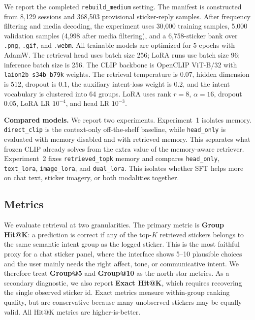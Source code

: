 \documentclass[10pt,twocolumn,letterpaper]{article}
\begin{document}
We report the completed \texttt{rebuild\_medium} setting. The manifest is
constructed from 8{,}129 sessions and 368{,}503 provisional sticker-reply
samples. After frequency filtering and media decoding, the experiment uses
30{,}000 training samples, 5{,}000 validation samples (4{,}998 after media
filtering), and a 6{,}758-sticker bank over \texttt{.png}, \texttt{.gif}, and
\texttt{.webm}. All trainable models are optimized for 5 epochs with AdamW.
The retrieval head uses batch size 256; LoRA runs use batch size 96; inference
batch size is 256. The CLIP backbone is OpenCLIP ViT-B/32 with
\texttt{laion2b\_s34b\_b79k} weights. The retrieval temperature is $0.07$,
hidden dimension is 512, dropout is $0.1$, the auxiliary intent-loss weight
is $0.2$, and the intent vocabulary is clustered into 64 groups. LoRA uses
rank $r{=}8$, $\alpha{=}16$, dropout $0.05$, LoRA LR $10^{-4}$, and head LR
$10^{-3}$.

\noindent\textbf{Compared models.}
We report two experiments. Experiment~1 isolates memory. \texttt{direct\_clip}
is the context-only off-the-shelf baseline, while \texttt{head\_only} is
evaluated with memory disabled and with retrieved memory. This separates what
frozen CLIP already solves from the extra value of the memory-aware retriever.
Experiment~2 fixes \texttt{retrieved\_topk} memory and
compares \texttt{head\_only}, \texttt{text\_lora}, \texttt{image\_lora}, and
\texttt{dual\_lora}. This isolates whether SFT helps more on chat text,
sticker imagery, or both modalities together.

\subsection{Metrics}

We evaluate retrieval at two granularities. The primary metric is
\textbf{Group Hit@K}: a prediction is correct if any of the top-$K$ retrieved
stickers belongs to the same semantic intent group as the logged sticker. This
is the most faithful proxy for a chat sticker panel, where the interface shows
5--10 plausible choices and the user mainly needs the right affect, tone, or
communicative intent. We therefore treat \textbf{Group@5} and
\textbf{Group@10} as the north-star metrics. As a secondary diagnostic, we
also report \textbf{Exact Hit@K}, which requires recovering the single
observed sticker id. Exact metrics measure within-group ranking quality, but
are conservative because many unobserved stickers may be equally valid. All
Hit@K metrics are higher-is-better.
\end{document}
